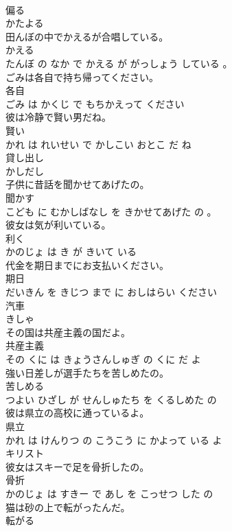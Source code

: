 \documentclass[8pt]{extreport}
\begin{document}
\begin{CJK}{UTF8}{min}
\\	偏る	
\\	かたよる			
\\	田んぼの中でかえるが合唱している。	
\\	かえる 
\\	たんぼ の なか で かえる が がっしょう している 。			
\\	ごみは各自で持ち帰ってください。	
\\	各自 
\\	ごみ は かくじ で もちかえって ください			
\\	彼は冷静で賢い男だね。	
\\	賢い 
\\	かれ は れいせい で かしこい おとこ だ ね			
\\	貸し出し	
\\	かしだし			
\\	子供に昔話を聞かせてあげたの。	
\\	聞かす 
\\	こども に むかしばなし を きかせてあげた の 。			
\\	彼女は気が利いている。	
\\	利く 
\\	かのじょ は き が きいて いる			
\\	代金を期日までにお支払いください。	
\\	期日 
\\	だいきん を きじつ まで に おしはらい ください			
\\	汽車	
\\	きしゃ			
\\	その国は共産主義の国だよ。	
\\	共産主義 
\\	その くに は きょうさんしゅぎ の くに だ よ			
\\	強い日差しが選手たちを苦しめたの。	
\\	苦しめる 
\\	つよい ひざし が せんしゅたち を くるしめた の			
\\	彼は県立の高校に通っているよ。	
\\	県立 
\\	かれ は けんりつ の こうこう に かよって いる よ			
\\	キリスト	
\\	彼女はスキーで足を骨折したの。	
\\	骨折 
\\	かのじょ は すきー で あし を こっせつ した の			
\\	猫は砂の上で転がったんだ。	
\\	転がる 

\end{CJK}
\end{document}
